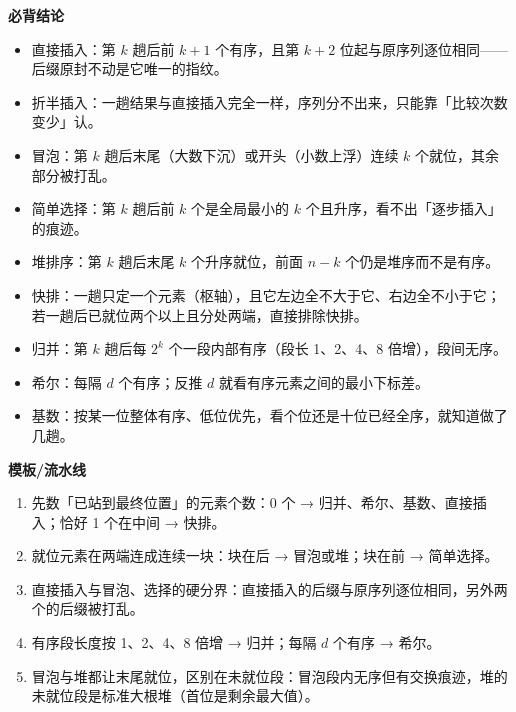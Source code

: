 \documentclass[10pt,a4paper]{ctexart}
\begin{document}
\textbf{必背结论}

\begin{itemize}

\item 直接插入：第 $k$ 趟后前 $k+1$ 个有序，且第 $k+2$ 位起与原序列逐位相同——后缀原封不动是它唯一的指纹。

\item 折半插入：一趟结果与直接插入完全一样，序列分不出来，只能靠「比较次数变少」认。

\item 冒泡：第 $k$ 趟后末尾（大数下沉）或开头（小数上浮）连续 $k$ 个就位，其余部分被打乱。

\item 简单选择：第 $k$ 趟后前 $k$ 个是全局最小的 $k$ 个且升序，看不出「逐步插入」的痕迹。

\item 堆排序：第 $k$ 趟后末尾 $k$ 个升序就位，前面 $n-k$ 个仍是堆序而不是有序。

\item 快排：一趟只定一个元素（枢轴），且它左边全不大于它、右边全不小于它；若一趟后已就位两个以上且分处两端，直接排除快排。

\item 归并：第 $k$ 趟后每 $2^k$ 个一段内部有序（段长 1、2、4、8 倍增），段间无序。

\item 希尔：每隔 $d$ 个有序；反推 $d$ 就看有序元素之间的最小下标差。

\item 基数：按某一位整体有序、低位优先，看个位还是十位已经全序，就知道做了几趟。

\end{itemize}

\textbf{模板/流水线}

\begin{enumerate}

\item 先数「已站到最终位置」的元素个数：0 个 → 归并、希尔、基数、直接插入；恰好 1 个在中间 → 快排。

\item 就位元素在两端连成连续一块：块在后 → 冒泡或堆；块在前 → 简单选择。

\item 直接插入与冒泡、选择的硬分界：直接插入的后缀与原序列逐位相同，另外两个的后缀被打乱。

\item 有序段长度按 1、2、4、8 倍增 → 归并；每隔 $d$ 个有序 → 希尔。

\item 冒泡与堆都让末尾就位，区别在未就位段：冒泡段内无序但有交换痕迹，堆的未就位段是标准大根堆（首位是剩余最大值）。

\end{enumerate}
\end{document}
